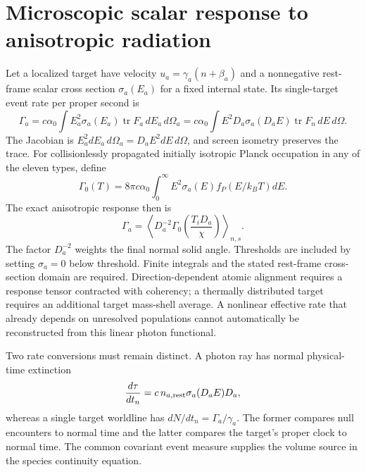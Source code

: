 \section{Microscopic scalar response to anisotropic radiation}
\label{ii:scalar_response_section}
Let a localized target have velocity $u_a=\gamma_a(n+\beta_a)$ and a nonnegative rest-frame scalar cross section $\sigma_a(E_a)$ for a fixed internal state. Its single-target event rate per proper second is
\begin{equation}
 \Gamma_a=c\alpha_0\int E_a^2\sigma_a(E_a)\operatorname{tr}F_a\,dE_a\,d\Omega_a
 =c\alpha_0\int E^2D_a\sigma_a(D_aE)\operatorname{tr}F_n\,dE\,d\Omega.
 \label{ii:target_event_rate}
\end{equation}
The Jacobian is $E_a^2dE_a\,d\Omega_a=D_aE^2dE\,d\Omega$, and screen isometry preserves the trace. For collisionlessly propagated initially isotropic Planck occupation in any of the eleven types, define
\begin{equation}
 \Gamma_0(T)=8\pi c\alpha_0\int_0^\infty E^2\sigma_a(E)f_P(E/k_BT)dE.
 \label{ii:scalar_rate_isotropic}
\end{equation}
The exact anisotropic response then is
\begin{equation}
 \Gamma_a=\left\langle D_a^{-2}\Gamma_0\!\left(\frac{T_iD_a}{\chi}\right)\right\rangle_{n,s}.
 \label{ii:scalar_rate_all_bianchi}
\end{equation}
The factor $D_a^{-2}$ weights the final normal solid angle. Thresholds are included by setting $\sigma_a=0$ below threshold. Finite integrals and the stated rest-frame cross-section domain are required. Direction-dependent atomic alignment requires a response tensor contracted with coherency; a thermally distributed target requires an additional target mass-shell average. A nonlinear effective rate that already depends on unresolved populations cannot automatically be reconstructed from this linear photon functional.

Two rate conversions must remain distinct. A photon ray has normal physical-time extinction
\begin{equation}
 \frac{d\tau}{dt_n}=c\,n_{a,\rm rest}\sigma_a(D_aE)D_a,
 \label{ii:extinction_clock}
\end{equation}
whereas a single target worldline has $dN/dt_n=\Gamma_a/\gamma_a$. The former compares null encounters to normal time and the latter compares the target's proper clock to normal time. The common covariant event measure supplies the volume source in the species continuity equation.

